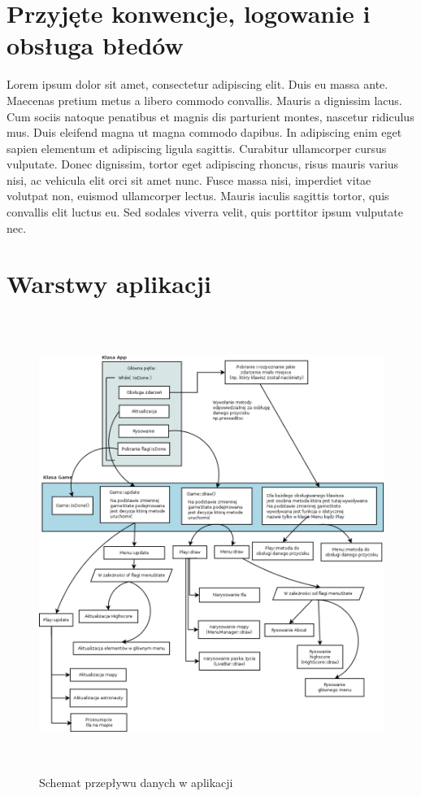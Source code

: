 \section{Przyjęte konwencje, logowanie i obsługa błedów}
Lorem ipsum dolor sit amet, consectetur adipiscing elit. Duis eu massa ante. Maecenas pretium metus a libero commodo convallis. Mauris a dignissim lacus. Cum sociis natoque penatibus et magnis dis parturient montes, nascetur ridiculus mus. Duis eleifend magna ut magna commodo dapibus. In adipiscing enim eget sapien elementum et adipiscing ligula sagittis. Curabitur ullamcorper cursus vulputate. Donec dignissim, tortor eget adipiscing rhoncus, risus mauris varius nisi, ac vehicula elit orci sit amet nunc. Fusce massa nisi, imperdiet vitae volutpat non, euismod ullamcorper lectus. Mauris iaculis sagittis tortor, quis convallis elit luctus eu. Sed sodales viverra velit, quis porttitor ipsum vulputate nec.



\section{Warstwy aplikacji}

\begin{figure}[h]
    \centering
    \includegraphics[width=430px,height=560px]{./Pictures/warstwy.png}
    \caption{Schemat przepływu danych w aplikacji}
\end{figure}

